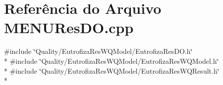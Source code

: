 \section{Referência do Arquivo M\+E\+N\+U\+Res\+D\+O.\+cpp}
\label{_m_e_n_u_res_d_o_8cpp}
{\ttfamily \#include \char`\"{}Quality/\+Eutrofiza\+Res\+W\+Q\+Model/\+Eutrofiza\+Res\+D\+O.\+h\char`\"{}}\\*
{\ttfamily \#include \char`\"{}Quality/\+Eutrofiza\+Res\+W\+Q\+Model/\+Eutrofiza\+Res\+W\+Q\+Model.\+h\char`\"{}}\\*
{\ttfamily \#include \char`\"{}Quality/\+Eutrofiza\+Res\+W\+Q\+Model/\+Eutrofiza\+Res\+W\+Q\+Result.\+h\char`\"{}}\\*
